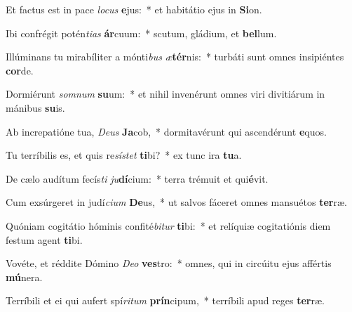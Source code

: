 \item Et factus est in pace \textit{lo}\textit{cus} \textbf{e}jus:~* et habitátio ejus in \textbf{Si}on.
\item Ibi confrégit potén\textit{ti}\textit{as} \textbf{ár}cuum:~* scutum, gládium, et \textbf{bel}lum.
\item Illúminans tu mirabíliter a mónti\textit{bus} \textit{æ}\textbf{tér}nis:~* turbáti sunt omnes insipiéntes \textbf{cor}de.
\item Dormiérunt \textit{som}\textit{num} \textbf{su}um:~* et nihil invenérunt omnes viri divitiárum in mánibus \textbf{su}is.
\item Ab increpatióne tua, \textit{De}\textit{us} \textbf{Ja}cob,~* dormitavérunt qui ascendérunt \textbf{e}quos.
\item Tu terríbilis es, et quis re\textit{sís}\textit{tet} \textbf{ti}bi?~* ex tunc ira \textbf{tu}a.
\item De cælo audítum fecís\textit{ti} \textit{ju}\textbf{dí}cium:~* terra trémuit et qui\textbf{é}vit.
\item Cum exsúrgeret in judí\textit{ci}\textit{um} \textbf{De}us,~* ut salvos fáceret omnes mansuétos \textbf{ter}ræ.
\item Quóniam cogitátio hóminis confité\textit{bi}\textit{tur} \textbf{ti}bi:~* et relíquiæ cogitatiónis diem festum agent \textbf{ti}bi.
\item Vovéte, et réddite Dómino \textit{De}\textit{o} \textbf{ves}tro:~* omnes, qui in circúitu ejus affértis \textbf{mú}nera.
\item Terríbili et ei qui aufert spí\textit{ri}\textit{tum} \textbf{prín}cipum,~* terríbili apud reges \textbf{ter}ræ.
